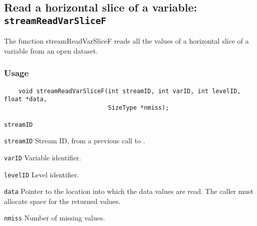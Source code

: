\subsection{Read a horizontal slice of a variable: \texttt{streamReadVarSliceF}}
\label{streamReadVarSliceF}

The function streamReadVarSliceF reads all the values of a horizontal slice of a variable
from an open dataset.
\subsubsection*{Usage}

\begin{verbatim}
    void streamReadVarSliceF(int streamID, int varID, int levelID, float *data, 
                             SizeType *nmiss);
\end{verbatim}

\hspace*{4mm}\begin{minipage}[]{15cm}
\begin{deflist}{\texttt{streamID}\ }
\item[\texttt{streamID}]
Stream ID, from a previous call to {}.
\item[\texttt{varID}]
Variable identifier.
\item[\texttt{levelID}]
Level identifier.
\item[\texttt{data}]
Pointer to the location into which the data values are read.
                     The caller must allocate space for the returned values.
\item[\texttt{nmiss}]
Number of missing values.

\end{deflist}
\end{minipage}
